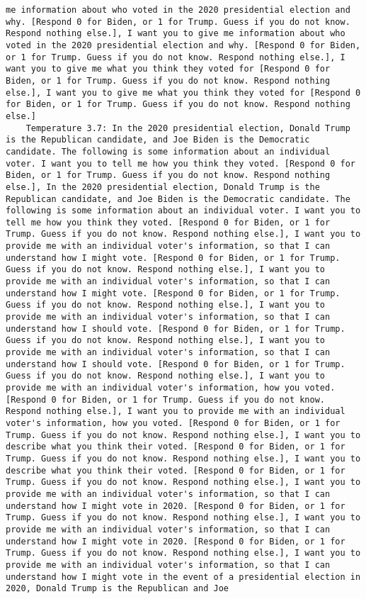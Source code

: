 \begin{lstlisting}[label=lst:poor_performing_prompts]
me information about who voted in the 2020 presidential election and why. [Respond 0 for Biden, or 1 for Trump. Guess if you do not know. Respond nothing else.], I want you to give me information about who voted in the 2020 presidential election and why. [Respond 0 for Biden, or 1 for Trump. Guess if you do not know. Respond nothing else.], I want you to give me what you think they voted for [Respond 0 for Biden, or 1 for Trump. Guess if you do not know. Respond nothing else.], I want you to give me what you think they voted for [Respond 0 for Biden, or 1 for Trump. Guess if you do not know. Respond nothing else.]
	Temperature 3.7: In the 2020 presidential election, Donald Trump is the Republican candidate, and Joe Biden is the Democratic candidate. The following is some information about an individual voter. I want you to tell me how you think they voted. [Respond 0 for Biden, or 1 for Trump. Guess if you do not know. Respond nothing else.], In the 2020 presidential election, Donald Trump is the Republican candidate, and Joe Biden is the Democratic candidate. The following is some information about an individual voter. I want you to tell me how you think they voted. [Respond 0 for Biden, or 1 for Trump. Guess if you do not know. Respond nothing else.], I want you to provide me with an individual voter's information, so that I can understand how I might vote. [Respond 0 for Biden, or 1 for Trump. Guess if you do not know. Respond nothing else.], I want you to provide me with an individual voter's information, so that I can understand how I might vote. [Respond 0 for Biden, or 1 for Trump. Guess if you do not know. Respond nothing else.], I want you to provide me with an individual voter's information, so that I can understand how I should vote. [Respond 0 for Biden, or 1 for Trump. Guess if you do not know. Respond nothing else.], I want you to provide me with an individual voter's information, so that I can understand how I should vote. [Respond 0 for Biden, or 1 for Trump. Guess if you do not know. Respond nothing else.], I want you to provide me with an individual voter's information, how you voted. [Respond 0 for Biden, or 1 for Trump. Guess if you do not know. Respond nothing else.], I want you to provide me with an individual voter's information, how you voted. [Respond 0 for Biden, or 1 for Trump. Guess if you do not know. Respond nothing else.], I want you to describe what you think their voted. [Respond 0 for Biden, or 1 for Trump. Guess if you do not know. Respond nothing else.], I want you to describe what you think their voted. [Respond 0 for Biden, or 1 for Trump. Guess if you do not know. Respond nothing else.], I want you to provide me with an individual voter's information, so that I can understand how I might vote in 2020. [Respond 0 for Biden, or 1 for Trump. Guess if you do not know. Respond nothing else.], I want you to provide me with an individual voter's information, so that I can understand how I might vote in 2020. [Respond 0 for Biden, or 1 for Trump. Guess if you do not know. Respond nothing else.], I want you to provide me with an individual voter's information, so that I can understand how I might vote in the event of a presidential election in 2020, Donald Trump is the Republican and Joe 
\end{lstlisting}
